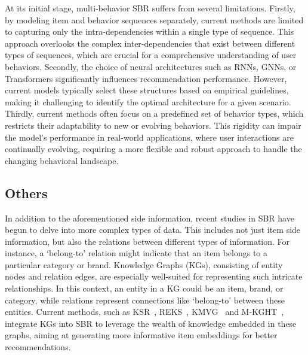 \documentclass[lettersize,journal]{IEEEtran}
\begin{document}
At its initial stage, multi-behavior SBR suffers from several limitations. Firstly, by modeling item and behavior sequences separately, current methods are limited to capturing only the intra-dependencies within a single type of sequence. This approach overlooks the complex inter-dependencies that exist between different types of sequences, which are crucial for a comprehensive understanding of user behaviors. Secondly, the choice of neural architectures such as RNNs, GNNs, or Transformers significantly influences recommendation performance. However, current models typically select these structures based on empirical guidelines, making it challenging to identify the optimal architecture for a given scenario. Thirdly, current methods often focus on a predefined set of behavior types, which restricts their adaptability to new or evolving behaviors. This rigidity can impair the model's performance in real-world applications, where user interactions are continually evolving, requiring a more flexible and robust approach to handle the changing behavioral landscape.



\subsection{Others}\label{othersbr}
In addition to the aforementioned side information, recent studies in SBR have begun to delve into more complex types of data. This includes not just item side information, but also the relations between different types of information. For instance, a `belong-to' relation might indicate that an item belongs to a particular category or brand. Knowledge Graphs (KGs), consisting of entity nodes and relation edges, are especially well-suited for representing such intricate relationships. In this context, an entity in a KG could be an item, brand, or category, while relations represent connections like `belong-to' between these entities. 
Current methods, such as KSR~\cite{Huang@SIGIR2018},  REKS~\cite{Wu@ICDE2023}, KMVG~\cite{Chen@SIGIR2023} and M-KGHT~\cite{Wang@WWW2024}, integrate KGs into SBR to leverage the wealth of knowledge embedded in these graphs, aiming at generating more informative item embeddings for better recommendations.
\end{document}
